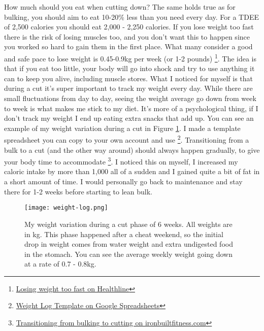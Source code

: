 \documentclass[openany, 12pt]{book}
\begin{document}
	How much should you eat when cutting down? The same holds true as for bulking, you should aim to eat 10-20\% less than you need every day. For a TDEE of 2,500 calories you should eat
        2,000 - 2,250 calories. If you lose weight too fast there is the risk of losing muscles too, and you don't want this to happen since you worked so hard to gain them in the first place. 
	What many consider a good and safe pace to lose weight is 0.45-0.9kg per week (or 1-2 pounds)
        \footnote{\href{https://www.healthline.com/nutrition/losing-weight-too-fast}{Losing weight too fast on Healthline}}. The idea is that if you eat too little, your body will go into shock and
        try to use anything it can to keep you alive, including muscle stores. What I noticed for myself is that during a cut it's super important to track my weight every day. While there are small
        fluctuations from day to day, seeing the weight average go down from week to week is what makes me stick to my diet. It's more of a psychological thing, if I don't track my weight I end
        up eating extra snacks that add up. You can see an example of my weight variation during a cut in Figure \ref{fig2}. I made a template spreadsheet you can copy to your own account and use
        \footnote{\href{https://docs.google.com/spreadsheets/d/1TwKuVdjB4NOsYLS-gaC_n4aW24H7wEHXBG7mkBikm2I/edit?usp=sharing}{Weight Log Template on Google Spreadsheets}}.
        Transitioning from a bulk to a cut (and the other way around) should always happen gradually, to give your body time to accommodate
        \footnote{\href{https://www.ironbuiltfitness.com/transition-from-cutting-to-bulking}{Transitioning from bulking to cutting on ironbuiltfitness.com}}. 
	I noticed this on myself, I increased my caloric intake by more than 1,000 all of a sudden and I gained quite a bit of fat in a short amount of time. I would
	personally go back to maintenance and stay there for 1-2 weeks before starting to lean bulk.
        
	\begin{figure}[h]
		\centering
		\texttt{[image: weight-log.png]}
		\caption{My weight variation during a cut phase of 6 weeks. All weights are in kg. This phase happened after a cheat weekend, so the initial drop in weight comes from water weight and
                  extra undigested food in the stomach. You can see the average weekly weight going down at a rate of 0.7 - 0.8kg.}
		\label{fig2}
	\end{figure}
	
\end{document}
